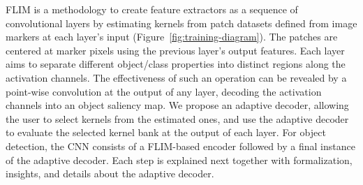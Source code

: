 \documentclass[10pt,twocolumn,twoside]{IEEEtran}
\begin{document}
FLIM is a methodology to create feature extractors as a sequence of convolutional layers by estimating kernels from patch datasets defined from image markers at each layer's input (Figure~\ref{fig:training-diagram}). The patches are centered at marker pixels using the previous layer's output features. Each layer aims to separate different object/class properties into distinct regions along the activation channels. The effectiveness of such an operation can be revealed by a point-wise convolution at the output of any layer, decoding the activation channels into an object saliency map. We propose an adaptive decoder, allowing the user to select kernels from the estimated ones, and use the adaptive decoder to evaluate the selected kernel bank at the output of each layer. For object detection, the CNN consists of a FLIM-based encoder followed by a final instance of the adaptive decoder. Each step is explained next together with formalization, insights, and details about the adaptive decoder.
    
\end{document}
